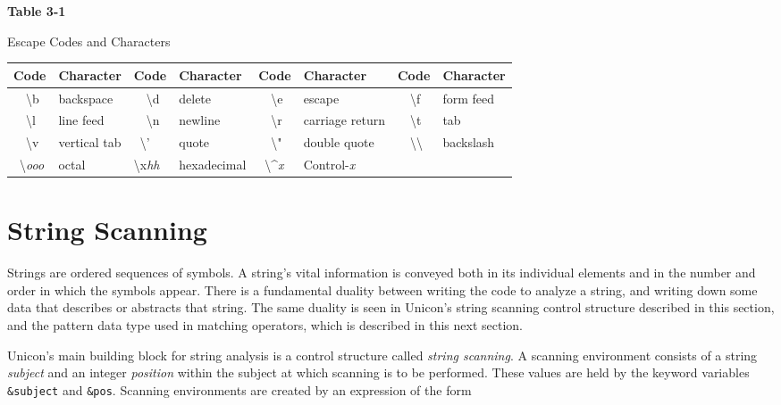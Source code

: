 \medskip

\begin{center}
{\sffamily\bfseries
Table 3-1

Escape Codes and Characters
}
\end{center}

\begin{center}
\begin{xtabular}{|m{0.38in}|m{0.8in}|m{0.4in}|m{0.855in}|m{0.38in}|m{1.14in}|m{0.38in}|m{0.68in}|}
\hline
\sffamily\bfseries Code &
\sffamily\bfseries Character &
\sffamily\bfseries Code &
\sffamily\bfseries Character &
\sffamily\bfseries Code &
\sffamily\bfseries Character &
\sffamily\bfseries Code &
\sffamily\bfseries Character\\\hline
\ \ {\textbackslash}b &
backspace &
\ \ {\textbackslash}d &
delete &
\ \ {\textbackslash}e &
escape &
\ \ {\textbackslash}f &
form feed\\\hline
\ \ {\textbackslash}l &
line feed &
\ \ {\textbackslash}n &
newline &
\ \ {\textbackslash}r &
carriage return &
\ \ {\textbackslash}t &
tab\\\hline
\ \ {\textbackslash}v &
vertical tab &
\ {\textbackslash}' &
quote &
\ \ {\textbackslash}" &
double quote &
\ \ {\textbackslash}{\textbackslash} &
backslash\\\hline
\ {\textbackslash}\textit{ooo} &
octal &
{\textbackslash}x\textit{hh} &
hexadecimal  &
\ {\textbackslash}\^{}\textit{x} &
Control-\textit{x} &
~
 &
~
\\\hline
\end{xtabular}
\end{center}

\section{String Scanning}

Strings are ordered sequences of symbols. A string's vital information
is conveyed both in its individual elements and in
the number and order in which the symbols appear.
There is a fundamental duality between writing the code to analyze a
string, and writing down some data that describes or abstracts
that string. The same duality is seen in Unicon's string scanning
control structure described in this section, and the pattern data type
used in matching operators, which is described in this next section.

Unicon's main building block for string analysis is a control
structure called \textit{string scanning}. A
scanning environment consists of a string
\textit{subject} and an
integer \textit{position} within the subject at
which scanning is to be performed. These values are held by the keyword
variables \texttt{\&subject} and \texttt{\&pos}. Scanning environments
are created by an expression of the form

